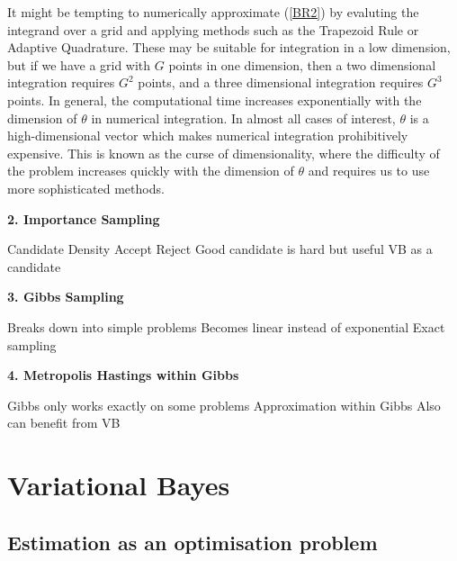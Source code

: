 \documentclass{article}\usepackage[]{graphicx}\usepackage[]{color}
\numberwithin{equation}{section}
\begin{document}
It might be tempting to numerically approximate (\ref{BR2}) by evaluting the integrand over a grid and applying methods such as the Trapezoid Rule or Adaptive Quadrature. These may be suitable for integration in a low dimension, but if we have a grid with $G$ points in one dimension, then a two dimensional integration requires $G^2$ points, and a three dimensional integration requires $G^3$ points. In general, the computational time increases exponentially with the dimension of $\theta$ in numerical integration. In almost all cases of interest, $\theta$ is a high-dimensional vector which makes numerical integration prohibitively expensive. This is known as the curse of dimensionality, where the difficulty of the problem increases quickly with the dimension of $\theta$ and requires us to use more sophisticated methods.\newline

\textbf{2. Importance Sampling} \newline

Candidate Density
Accept Reject
Good candidate is hard but useful
VB as a candidate \newline

\textbf{3. Gibbs Sampling}\newline

Breaks down into simple problems
Becomes linear instead of exponential
Exact sampling \newline

\textbf{4. Metropolis Hastings within Gibbs}\newline

Gibbs only works exactly on some problems
Approximation within Gibbs
Also can benefit from VB

\section{Variational Bayes}

\subsection{Estimation as an optimisation problem}
\end{document}
